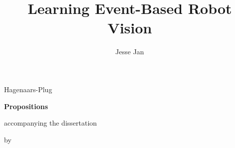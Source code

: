 \documentclass{propositions}
\begin{document}
\title{Learning Event-Based Robot Vision}
\author{Jesse Jan}{Hagenaars-Plug}

\begin{center}

{\Large\titlefont\bfseries Propositions}

\medskip

accompanying the dissertation

\medskip

{\makeatletter
\titlestyle\bfseries\large\@title
\makeatother}

{\makeatletter
\ifx\@subtitle\undefined\else
    \titlefont\titleshape\@subtitle
\fi
\makeatother}

\smallskip

by

\smallskip

\makeatletter
{\large\titlefont\bfseries\@firstname\ {\titleshape\@lastname}}
\makeatother

\end{center}

\vspace{2.5pt}
\end{document}
